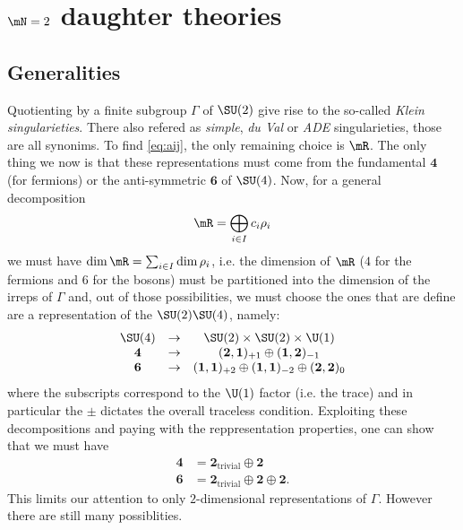 \documentclass{worksheetclass}
\begin{document}
\section{$\mN=2$ daughter theories}\label{sec:N2QGT}

    \subsection{Generalities}

        Quotienting by a finite subgroup $\Gamma$ of $\SU(2)$ give rise to the so-called \emph{Klein singularieties}. There also refered as \emph{simple}, \emph{du Val} or \emph{ADE} singularieties, those are all synonims. To find \eqref{eq:aij}, the only remaining choice is $\mR$. The only thing we now is that these representations must come from the fundamental $\boldsymbol{4}$ (for fermions) or the anti-symmetric $\boldsymbol{6}$ of $\SU(4)$. Now, for a general decomposition
        \begin{equation}
            \mR=\bigoplus_{i\in I}c_i\rho_i
        \end{equation}
        we must have $\dim\mR=\sum_{i\in I}\dim\rho_i$, i.e. the dimension of $\mR$ ($4$ for the fermions and $6$ for the bosons) must be partitioned into the dimension of the irreps of $\Gamma$ and, out of those possibilities, we must choose the ones that are define are a representation of the $\SU(2)\SU(4)$, namely:
        \begin{equation}
            \begin{array}{ccc}
                \SU(4)&\to&\SU(2)\times\SU(2)\times\U(1)\\
                \boldsymbol{4}&\to&(\boldsymbol{2},\boldsymbol{1})_{+1}\oplus(\boldsymbol{1},\boldsymbol{2})_{-1}\\
                \boldsymbol{6}&\to&(\boldsymbol{1},\boldsymbol{1})_{+2}\oplus(\boldsymbol{1},\boldsymbol{1})_{-2}\oplus(\boldsymbol{2},\boldsymbol{2})_{0}
            \end{array}
        \end{equation}
        where the subscripts correspond to the $\U(1)$ factor (i.e. the trace) and in particular the $\pm$ dictates the overall traceless condition. Exploiting these decompositions and paying with the reppresentation properties, one can show that we must have \cite{Hanany_1999}
        \begin{align}
            \boldsymbol{4}&=\boldsymbol{2}_{\text{trivial}}\oplus\boldsymbol{2}\\
            \boldsymbol{6}&=\boldsymbol{2}_{\text{trivial}}\oplus\boldsymbol{2}\oplus\boldsymbol{2}.
        \end{align}
        This limits our attention to only $2$-dimensional representations of $\Gamma$. However there are still many possiblities.
        
\end{document}
